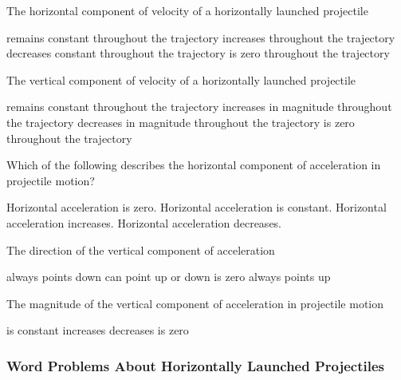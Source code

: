 \documentclass[../main-physics-problems.tex]{subfiles}
\begin{document}
\begin{questions}
\question
The horizontal component of velocity of a horizontally launched projectile

\begin{randomizechoices}
    \correctchoice remains constant throughout the trajectory
    \choice increases throughout the trajectory
    \choice decreases constant throughout the trajectory
    \choice is zero throughout the trajectory
\end{randomizechoices}

\question
The vertical component of velocity of a horizontally launched projectile

\begin{randomizechoices}
    \choice remains constant throughout the trajectory
    \choice increases in magnitude throughout the trajectory
    \choice decreases in magnitude throughout the trajectory
    \choice is zero throughout the trajectory
\end{randomizechoices}

\question
Which of the following describes the horizontal component of acceleration in projectile motion?

\begin{randomizechoices}
    \correctchoice Horizontal acceleration is zero.
    \choice Horizontal acceleration is constant.
    \choice Horizontal acceleration increases.
    \choice Horizontal acceleration decreases.
\end{randomizechoices}

\question
The direction of the vertical component of acceleration

\begin{randomizechoices}
    \correctchoice always points down
    \choice can point up or down
    \choice is zero
    \choice always points up
\end{randomizechoices}

\question
The magnitude of the vertical component of acceleration in projectile motion

\begin{randomizechoices}
    \correctchoice is constant
    \choice increases
    \choice decreases
    \choice is zero
\end{randomizechoices}
\end{questions}

\clearpage

\subsubsection{Word Problems About Horizontally Launched Projectiles}
\end{document}
